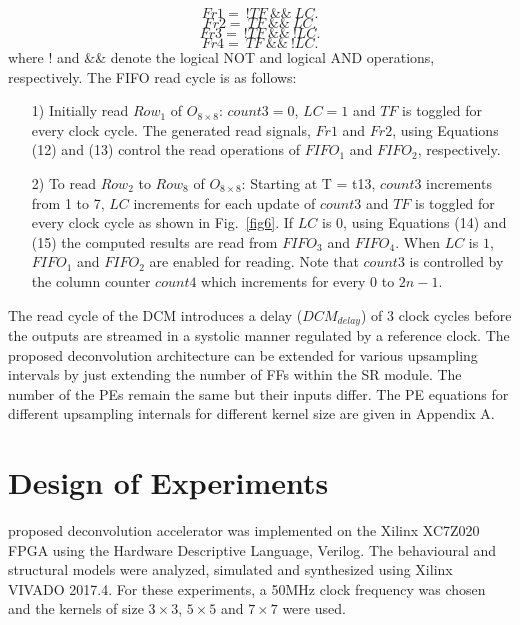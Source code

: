 \documentclass[journal]{IEEEtran}
\begin{document}
\begin{equation}
Fr1 = \ \textbf{!}TF\ \&\&\ LC.
\end{equation}
\begin{equation}
Fr2 = \ TF \ \&\&\ LC.
\end{equation}
\begin{equation}
Fr3 = \ \textbf{!}TF\ \&\&\ \textbf{!}LC.
\end{equation}
\begin{equation}
Fr4 = \ TF\ \&\&\ \textbf{!}LC.
\end{equation}
where $\textbf{!}$  and  \&\&  denote the logical NOT and logical AND operations, respectively. The FIFO read cycle is as follows:

\begin{itemize}[leftmargin=*]
    \item[1)] Initially read $Row_1$ of $O_{8 \times 8}$: $count3 = 0$, $LC = 1$ and $TF$ is toggled for every clock cycle. The generated read signals, $Fr1$ and $Fr2$, using Equations (12) and (13) control the read operations of $FIFO_1$ and $FIFO_2$, respectively. 
    
    \item[2)] To read $Row_2$ to $Row_8$ of $O_{8 \times 8}$: Starting at T = t13, $count3$ increments  from 1 to 7, $LC$ increments for each update of  $count3$ and $TF$ is toggled for every clock cycle as shown in Fig.~\ref{fig6}. If $LC$ is 0, using Equations (14) and (15) the computed results are read from $FIFO_3$ and $FIFO_4$. When $LC$ is $1$, $FIFO_1$ and $FIFO_2$ are enabled for reading. Note that $count3$ is controlled by the column counter $count4$ which increments for every $0$ to $2n-1$.
    
\end{itemize}


The read cycle of the DCM introduces a delay ($DCM_{delay}$) of 3 clock cycles before the outputs are streamed in a systolic manner regulated by a reference clock. The proposed deconvolution architecture  can be extended for various upsampling intervals by just extending the number of FFs within the SR module. The number of the PEs remain the same but their inputs differ. The PE equations for different upsampling internals for different kernel size are given in Appendix A.

\section{Design of Experiments}\label{sec:Design of Experiments}
 proposed deconvolution accelerator was implemented on the Xilinx XC7Z020 FPGA using the Hardware Descriptive Language, Verilog. The behavioural and structural models were analyzed, simulated and synthesized using Xilinx VIVADO 2017.4. For these experiments, a 50MHz clock frequency was chosen and the kernels of size $3\times3$, $5\times5$ and $7\times7$ were used.
\end{document}
